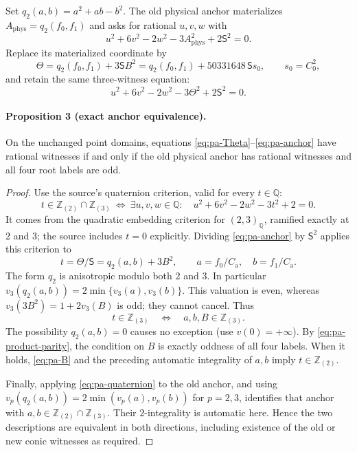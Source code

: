 Set $q_2(a,b)=a^2+ab-b^2$.  The old physical anchor materializes
$A_{\mathrm{phys}}=q_2(f_0,f_1)$ and asks for rational $u,v,w$ with
\[
 u^2+6v^2-2w^2-3A_{\mathrm{phys}}^2+2\mathsf S^2=0.
\]
Replace its materialized coordinate by
\begin{equation}\label{eq:pa-Theta}
 \Theta=q_2(f_0,f_1)+3\mathsf S B^2
        =q_2(f_0,f_1)+50331648\,\mathsf S s_0,
 \qquad s_0=C_0^2,
\end{equation}
and retain the same three-witness equation:
\begin{equation}\label{eq:pa-anchor}
 u^2+6v^2-2w^2-3\Theta^2+2\mathsf S^2=0.
\end{equation}

\paragraph{Proposition 3 (exact anchor equivalence).}
On the unchanged point domains, equations
\eqref{eq:pa-Theta}--\eqref{eq:pa-anchor} have rational witnesses if and
only if the old physical anchor has rational witnesses and all four
root labels are odd.

\begin{proof}
Use the source's quaternion criterion, valid for every $t\in\mathbb Q$:
\begin{equation}\label{eq:pa-quaternion}
 t\in\mathbb Z_{(2)}\cap\mathbb Z_{(3)}
 \ \Longleftrightarrow\
 \exists u,v,w\in\mathbb Q:\quad
 u^2+6v^2-2w^2-3t^2+2=0.
\end{equation}
It comes from the quadratic embedding criterion for $(2,3)_{\mathbb Q}$,
ramified exactly at $2$ and $3$; the source includes $t=0$ explicitly.
Dividing \eqref{eq:pa-anchor} by $\mathsf S^2$ applies this criterion to
\[
 t=\Theta/\mathsf S=q_2(a,b)+3B^2,
 \qquad a=f_0/C_{\mathrm a},\quad b=f_1/C_{\mathrm a}.
\]
The form $q_2$ is anisotropic modulo both $2$ and $3$.
In particular
$v_3(q_2(a,b))=2\min\{v_3(a),v_3(b)\}$.
This valuation is even, whereas $v_3(3B^2)=1+2v_3(B)$ is odd;
they cannot cancel.  Thus
\[
 t\in\mathbb Z_{(3)}
 \quad\Longleftrightarrow\quad
 a,b,B\in\mathbb Z_{(3)}.
\]
The possibility $q_2(a,b)=0$ causes no exception (use $v(0)=+\infty$).
By \eqref{eq:pa-product-parity}, the condition on $B$ is exactly
oddness of all four labels.  When it holds, \eqref{eq:pa-B} and the
preceding automatic integrality of $a,b$ imply $t\in\mathbb Z_{(2)}$.

Finally, applying \eqref{eq:pa-quaternion} to the old anchor, and using
$v_p(q_2(a,b))=2\min(v_p(a),v_p(b))$ for $p=2,3$, identifies that anchor
with $a,b\in\mathbb Z_{(2)}\cap\mathbb Z_{(3)}$.
Their $2$-integrality is automatic here.  Hence the two descriptions
are equivalent in both directions, including existence of the old
or new conic witnesses as required.
\end{proof}

